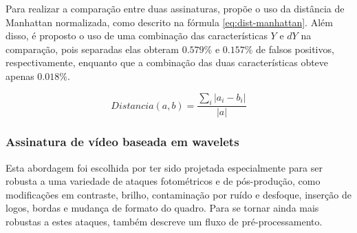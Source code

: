 Para realizar a comparação entre duas assinaturas, \citeauthor{cook2011efficient} propõe o uso da distância de Manhattan normalizada, como descrito na fórmula \ref{eq:dist-manhattan}. Além disso, é proposto o uso de uma combinação das características $Y$ e $dY$ na comparação, pois separadas elas obteram $0.579\%$ e $0.157\%$ de falsos positivos, respectivamente, enquanto que a combinação das duas características obteve apenas $0.018\%$. 

\begin{equation}
  Distancia(a,b) = \frac{\sum_i|a_i - b_i|}{|a|}
  \label{eq:dist-manhattan}
\end{equation}


    

    
%
%

\subsubsection{Assinatura de vídeo baseada em wavelets}

Esta abordagem foi escolhida por ter sido projetada especialmente para ser robusta a uma variedade de ataques fotométricos e de pós-produção, como modificações em contraste, brilho, contaminação por ruído e desfoque, inserção de logos, bordas e mudança de formato do quadro. Para se tornar ainda mais robustas a estes ataques, \citeauthor{Dutta2013} também descreve um fluxo de pré-processamento.

